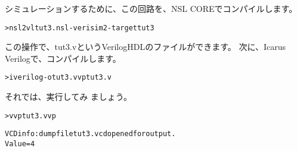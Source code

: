シミュレーションするために、この回路を、NSL COREでコンパイルします。

\begin{reviewcmd}
\begin{alltt}
\textgreater{} nsl2vl tut3.nsl -verisim2 -target tut3
\end{alltt}
\end{reviewcmd}

この操作で、tut3.vというVerilogHDLのファイルができます。
次に、Icarus Verilogで、コンパイルします。

\begin{reviewcmd}
\begin{alltt}
\textgreater{} iverilog -o tut3.vvp tut3.v
\end{alltt}
\end{reviewcmd}

それでは、実行してみ ましょう。

\begin{reviewcmd}
\begin{alltt}
\textgreater{} vvp tut3.vvp

VCD info: dumpfile tut3.vcd opened for output.
Value = 4
\end{alltt}
\end{reviewcmd}
